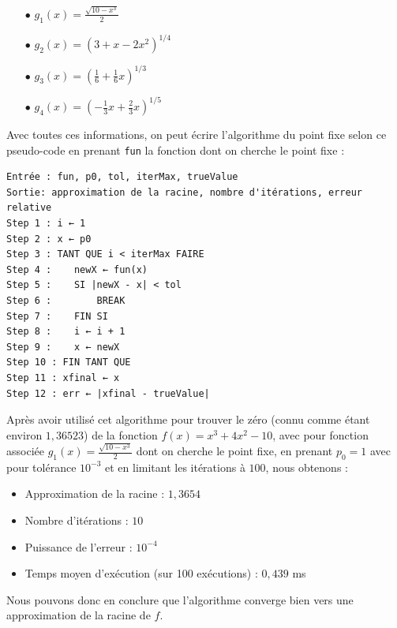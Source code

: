 \documentclass[12pt]{article}
\begin{document}
\begin{multicols}{2}
\begin{itemize}
    \item[$\bullet$] $g_1(x)=\frac{\sqrt{10-x^3}}{2}$
    \item[$\bullet$] $g_2(x)=(3 + x - 2x^2)^{1/4}$
    \item[$\bullet$] $g_3(x)=(\frac{1}{6}   + \frac{1}{6}x)^{1/3}$
    \item[$\bullet$] $g_4(x)=(-\frac{1}{3}x+\frac{2}{3}x)^{1/5}$
\end{itemize}
\end{multicols}
\noindent Avec toutes ces informations, on peut écrire l'algorithme du point fixe selon ce pseudo-code en prenant \texttt{fun} la fonction dont on cherche le point fixe :
\begin{verbatim}
Entrée : fun, p0, tol, iterMax, trueValue
Sortie: approximation de la racine, nombre d'itérations, erreur relative
Step 1 : i ← 1
Step 2 : x ← p0
Step 3 : TANT QUE i < iterMax FAIRE
Step 4 :    newX ← fun(x)
Step 5 :    SI |newX - x| < tol
Step 6 :        BREAK
Step 7 :    FIN SI
Step 8 :    i ← i + 1
Step 9 :    x ← newX
Step 10 : FIN TANT QUE
Step 11 : xfinal ← x
Step 12 : err ← |xfinal - trueValue|
\end{verbatim}
\noindent Après avoir utilisé cet algorithme pour trouver le zéro (connu comme étant environ $1,36523$) de la fonction $f(x) = x^3 + 4x^2 -10$, avec pour fonction associée $g_1(x)=\frac{\sqrt{10-x^3}}{2}$ dont on cherche le point fixe, en prenant $p_0=1$ avec pour tolérance $10^{-3}$ et en limitant les itérations à $100$, nous obtenons :
\begin{itemize}
    \item Approximation de la racine : $1,3654$
    \item Nombre d'itérations : $10$
    \item Puissance de l'erreur : $10^{-4}$
    \item Temps moyen d'exécution (sur 100 exécutions) : $0,439$ ms
\end{itemize}
Nous pouvons donc en conclure que l'algorithme converge bien vers une approximation de la racine de $f$.


\end{document}
